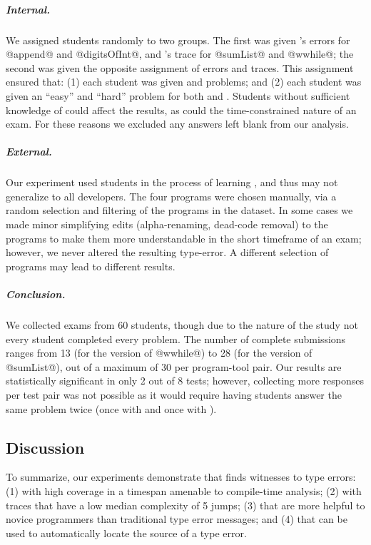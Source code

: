\subparagraph{Internal.}
%
We assigned students randomly to two groups. The first was given
\ocaml's errors for @append@ and \hbox{@digitsOfInt@,} and \toolname's trace
for @sumList@ and \hbox{@wwhile@;} the second was given the opposite
assignment of errors and traces. This assignment ensured that: (1) each
student was given \ocaml and \toolname problems; and (2) each student
was given an ``easy'' and ``hard'' problem for both \ocaml and
\toolname. Students without sufficient knowledge of \ocaml could affect
the results, as could the time-constrained nature of an exam. For these
reasons we excluded any answers left blank from our analysis.

\subparagraph{External.}
%
Our experiment used students in the process of learning \ocaml,
and thus may not generalize to all developers. The four
programs were chosen manually, via a random selection and
filtering of the programs in the \ucsdbench dataset. In some cases we made
minor simplifying edits (\eg alpha-renaming, dead-code removal) to the
programs to make them more understandable in the short timeframe of an
exam; however, we never altered the resulting type-error. A different
selection of programs may lead to different results.

\subparagraph{Conclusion.}
%
We collected exams from 60 students, though due to the nature of the
study not every student completed every problem.
%
The number of complete submissions ranges from 13 (for the \toolname
version of @wwhile@) to 28 (for the \ocaml version of @sumList@), out of
a maximum of 30 per program-tool pair.
%
Our results are statistically significant in only 2 out of 8 tests; however,
collecting more responses per test pair was not possible as it
would require having students answer the same problem twice (once with
\ocaml and once with \toolname).




\subsection{Discussion}
\label{sec:discussion}

To summarize, our experiments demonstrate that \nanomaly finds witnesses
to type errors:
%
(1) with high coverage in a timespan amenable to compile-time analysis;
%
(2) with traces that have a low median complexity of 5 jumps;
%
(3) that are more helpful to novice programmers than traditional type
error messages; and
%
(4) that can be used to automatically locate the source of a type error.

